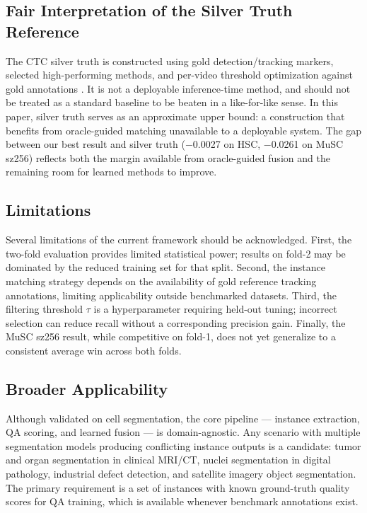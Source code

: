 \subsection{Fair Interpretation of the Silver Truth Reference}

The CTC silver truth is constructed using gold detection/tracking markers, selected high-performing
methods, and per-video threshold optimization against gold annotations \cite{mavska2023cell}. It is
not a deployable inference-time method, and should not be treated as a standard baseline to be
beaten in a like-for-like sense. In this paper, silver truth serves as an approximate upper bound:
a construction that benefits from oracle-guided matching unavailable to a deployable system. The
gap between our best result and silver truth ($-$0.0027 on HSC, $-$0.0261 on MuSC sz256) reflects
both the margin available from oracle-guided fusion and the remaining room for learned methods to
improve.

\subsection{Limitations}

Several limitations of the current framework should be acknowledged. First, the two-fold evaluation
provides limited statistical power; results on fold-2 may be dominated by the reduced training set
for that split. Second, the instance matching strategy depends on the availability of gold
reference tracking annotations, limiting applicability outside benchmarked datasets. Third, the
filtering threshold $\tau$ is a hyperparameter requiring held-out tuning; incorrect selection can
reduce recall without a corresponding precision gain. Finally, the MuSC sz256 result, while
competitive on fold-1, does not yet generalize to a consistent average win across both folds.

\subsection{Broader Applicability}

Although validated on cell segmentation, the core pipeline — instance extraction, QA scoring, and
learned fusion — is domain-agnostic. Any scenario with multiple segmentation models producing
conflicting instance outputs is a candidate: tumor and organ segmentation in clinical MRI/CT,
nuclei segmentation in digital pathology, industrial defect detection, and satellite imagery object
segmentation. The primary requirement is a set of instances with known ground-truth quality scores
for QA training, which is available whenever benchmark annotations exist.

